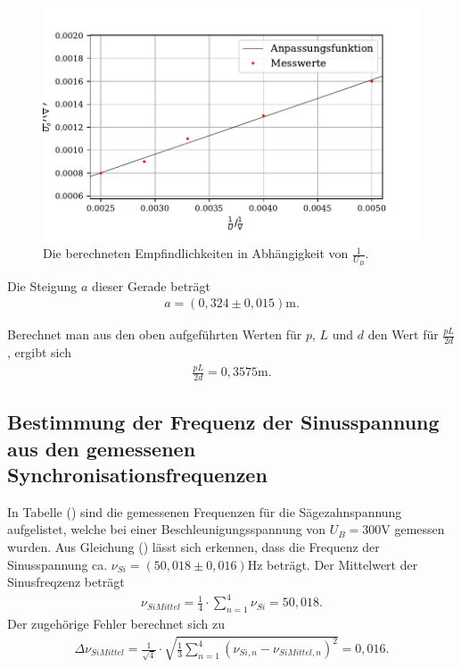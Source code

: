 \begin{figure}[H]
  \centering
  \includegraphics{plot8.pdf}
  \caption{Die berechneten Empfindlichkeiten in Abhängigkeit von $\frac{1}{U_B}$.}
  \label{fig:plot}
\end{figure}

\noindent Die Steigung $a$ dieser Gerade beträgt
\begin{align*}
a = (0,324 \pm 0,015)  \si{\meter} .
\end{align*}

\noindent Berechnet man aus den oben aufgeführten Werten für $p$, $L$ und $d$ den Wert für $\frac{pL}{2d}$, ergibt sich
\begin{align*}
\frac{pL}{2d} = 0,3575 \si{\meter}.
\end{align*}




\subsection{Bestimmung der Frequenz der Sinusspannung aus den gemessenen Synchronisationsfrequenzen}

In Tabelle () sind die gemessenen Frequenzen für die Sägezahnspannung aufgelistet, welche bei einer Beschleunigungsspannung von $U_B = 300 \si{\volt}$ gemessen wurden.
Aus Gleichung () lässt sich erkennen, dass die Frequenz der Sinusspannung ca. $\nu_{Si} = (50,018 \pm 0,016) \si{\hertz}$ beträgt.
Der Mittelwert der Sinusfreqzenz beträgt
\begin{align*}
\nu_{SiMittel} = \frac{1}{4}\cdot \sum_{n=1}^4 \nu_{Si} = 50,018 .
\end{align*}
Der zugehörige Fehler berechnet sich zu
\begin{align*}
\Delta\nu_{SiMittel} = \frac{1}{\sqrt{4}} \cdot \sqrt{\frac{1}{3} \sum_{n=1}^4 (\nu_{Si,n} - \nu_{SiMittel,n})^2} = 0,016 .
\end{align*}

